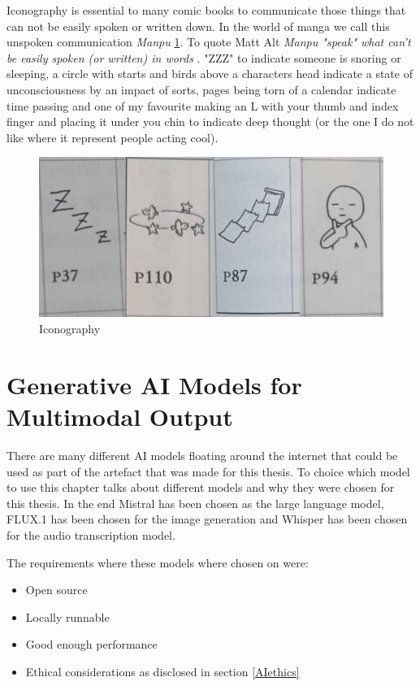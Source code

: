 Iconography is essential to many comic books to communicate those things that can not be easily spoken or written down. In the world of manga we call this unspoken communication \textit{Manpu} \ref{fig:Iconography}. To quote Matt Alt \textit{ Manpu "speak" what can't be easily spoken (or written) in words} \cite{GigaTown}. "ZZZ" to indicate someone is snoring or sleeping, a circle with starts and birds above a characters head indicate a state of unconsciousness by an impact of sorts, pages being torn of a calendar indicate time passing and one of my favourite making an L with your thumb and index finger and placing it under you chin to indicate deep thought (or the one I do not like where it represent people acting cool). 

\begin{figure}[!htp]
	\centering
	\includegraphics[scale=0.45]{images/IconographyGigaTown.png}
	\caption[Iconography]{Iconography \cite{GigaTown}}
	\label{fig:Iconography}
\end{figure}



\section{Generative AI Models for Multimodal Output}
There are many different AI models floating around the internet that could be used as part of the artefact that was made for this thesis. To choice which model to use this chapter talks about different models and why they were chosen for this thesis. In the end Mistral has been chosen as the large language model, FLUX.1 has been chosen for the image generation and Whisper has been chosen for the audio transcription model.

The requirements where these models where chosen on were:
\begin{itemize}
	\item Open source
	\item Locally runnable
	\item Good enough performance
	\item Ethical considerations as disclosed in section \ref{AIethics}
\end{itemize}
